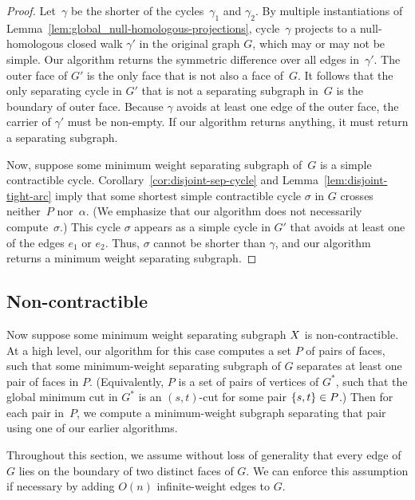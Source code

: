 \documentclass[11pt,twoside]{article}
\def\subsnip{\mathbin{\raisebox{0.15ex}{\rotatebox[origin=c]{60}{\footnotesize\Rightscissors}\!}}}
\def\Gsnip{\mathord{G_{\subsnip}}}
\def\Gsnip{G'}
\begin{document}
{\begin{proof}
Let~$\gamma$ be the shorter of the cycles~$\gamma_1$ and $\gamma_2$.  By multiple instantiations of Lemma~\ref{lem:global_null-homologous-projections}, cycle~$\gamma$ projects to a null-homologous closed walk $\gamma'$ in the original graph $G$, which may or may not be simple.
Our algorithm returns the symmetric difference over all edges in~$\gamma'$. The outer face of $\Gsnip$ is the only face that is not also a face of~$G$.
It follows that the only separating cycle in $\Gsnip$ that is not a separating subgraph in~$G$ is the boundary of outer face.  Because $\gamma$ avoids at least one edge of the outer face, the carrier of $\gamma'$ must be non-empty. If our algorithm returns anything, it must return a separating subgraph.

Now, suppose some minimum weight separating subgraph of~$G$ is a simple contractible cycle. Corollary~\ref{cor:disjoint-sep-cycle} and Lemma~\ref{lem:disjoint-tight-arc} imply that some shortest simple contractible cycle $\sigma$ in $G$ crosses neither~$P$ nor~$\alpha$.  (We emphasize that our algorithm does not necessarily compute~$\sigma$.)  This cycle $\sigma$ appears as a simple cycle in $\Gsnip$ that avoids at least one of the edges $e_1$ or $e_2$.  Thus, $\sigma$ cannot be shorter than $\gamma$, and our algorithm returns a minimum weight separating subgraph.
\end{proof}


\subsection{Non-contractible}
\label{sec:global_non-contractible}

Now suppose some minimum weight separating subgraph $X$ is non-contractible.  At a high level, our algorithm for this case computes a set $P$ of pairs of faces, such that some minimum-weight separating subgraph of $G$ separates at least one pair of faces in $P$.  (Equivalently, $P$ is a set of pairs of vertices of $G^*$, such that the global minimum cut in $G^*$ is an $(s,t)$-cut for some pair $\{ s,t \}\in P$.)  Then for each pair in~$P$, we compute a minimum-weight subgraph separating that pair using one of our earlier algorithms.

Throughout this section, we assume without loss of generality that every edge of $G$ lies on the boundary of two distinct faces of $G$.  We can enforce this assumption if necessary by adding $O(n)$ infinite-weight edges to $G$.

}
\end{document}
